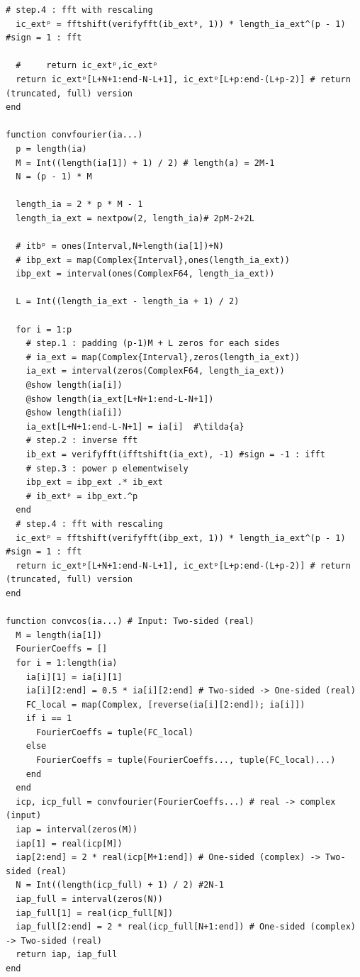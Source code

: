 \documentclass[11pt,a4paper,titlepage]{jsreport}
\theoremstyle{definition}
\providecommand{\DIFmodend}{} %
\begin{document}
\begin{lstlisting}[caption=IntervalFunctions.jl,alsolanguage=DIFcode]
  # step.4 : fft with rescaling
  ic_extᵖ = fftshift(verifyfft(ib_extᵖ, 1)) * length_ia_ext^(p - 1)  #sign = 1 : fft

  #     return ic_extᵖ,ic_extᵖ
  return ic_extᵖ[L+N+1:end-N-L+1], ic_extᵖ[L+p:end-(L+p-2)] # return (truncated, full) version
end

function convfourier(ia...)
  p = length(ia)
  M = Int((length(ia[1]) + 1) / 2) # length(a) = 2M-1
  N = (p - 1) * M

  length_ia = 2 * p * M - 1
  length_ia_ext = nextpow(2, length_ia)# 2pM-2+2L

  # itbᵖ = ones(Interval,N+length(ia[1])+N)
  # ibp_ext = map(Complex{Interval},ones(length_ia_ext))
  ibp_ext = interval(ones(ComplexF64, length_ia_ext))

  L = Int((length_ia_ext - length_ia + 1) / 2)

  for i = 1:p
    # step.1 : padding (p-1)M + L zeros for each sides
    # ia_ext = map(Complex{Interval},zeros(length_ia_ext))
    ia_ext = interval(zeros(ComplexF64, length_ia_ext))
    @show length(ia[i])
    @show length(ia_ext[L+N+1:end-L-N+1])
    @show length(ia[i])
    ia_ext[L+N+1:end-L-N+1] = ia[i]  #\tilda{a}
    # step.2 : inverse fft
    ib_ext = verifyfft(ifftshift(ia_ext), -1) #sign = -1 : ifft
    # step.3 : power p elementwisely
    ibp_ext = ibp_ext .* ib_ext
    # ib_extᵖ = ibp_ext.^p
  end
  # step.4 : fft with rescaling
  ic_extᵖ = fftshift(verifyfft(ibp_ext, 1)) * length_ia_ext^(p - 1)  #sign = 1 : fft
  return ic_extᵖ[L+N+1:end-N-L+1], ic_extᵖ[L+p:end-(L+p-2)] # return (truncated, full) version
end

function convcos(ia...) # Input: Two-sided (real)
  M = length(ia[1])
  FourierCoeffs = []
  for i = 1:length(ia)
    ia[i][1] = ia[i][1]
    ia[i][2:end] = 0.5 * ia[i][2:end] # Two-sided -> One-sided (real)
    FC_local = map(Complex, [reverse(ia[i][2:end]); ia[i]])
    if i == 1
      FourierCoeffs = tuple(FC_local)
    else
      FourierCoeffs = tuple(FourierCoeffs..., tuple(FC_local)...)
    end
  end
  icp, icp_full = convfourier(FourierCoeffs...) # real -> complex (input)
  iap = interval(zeros(M))
  iap[1] = real(icp[M])
  iap[2:end] = 2 * real(icp[M+1:end]) # One-sided (complex) -> Two-sided (real)
  N = Int((length(icp_full) + 1) / 2) #2N-1
  iap_full = interval(zeros(N))
  iap_full[1] = real(icp_full[N])
  iap_full[2:end] = 2 * real(icp_full[N+1:end]) # One-sided (complex) -> Two-sided (real)
  return iap, iap_full
end
\end{lstlisting}
\DIFmodend
 \newpage 



\end{document}
